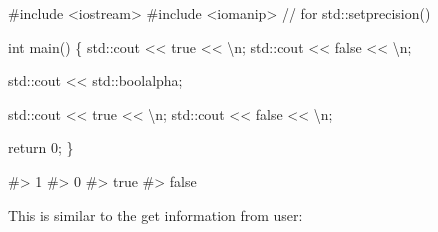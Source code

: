 \documentclass[
  letterpaper,
  DIV=11,
  numbers=noendperiod]{scrreprt}
\newenvironment{Shaded}{\begin{snugshade}}{\end{snugshade}}
\newcommand{\CommentTok}[1]{\textcolor[rgb]{0.37,0.37,0.37}{#1}}
\newcommand{\DecValTok}[1]{\textcolor[rgb]{0.68,0.00,0.00}{#1}}
\newcommand{\ErrorTok}[1]{\textcolor[rgb]{0.68,0.00,0.00}{#1}}
\newcommand{\FunctionTok}[1]{\textcolor[rgb]{0.28,0.35,0.67}{#1}}
\newcommand{\NormalTok}[1]{\textcolor[rgb]{0.00,0.23,0.31}{#1}}
\newcommand{\SpecialCharTok}[1]{\textcolor[rgb]{0.37,0.37,0.37}{#1}}
\newcommand{\StringTok}[1]{\textcolor[rgb]{0.13,0.47,0.30}{#1}}
\begin{document}
\begin{Shaded}
\begin{Highlighting}[]
\CommentTok{\#include \textless{}iostream\textgreater{}}
\CommentTok{\#include \textless{}iomanip\textgreater{}      // for std::setprecision()}

\NormalTok{int }\FunctionTok{main}\NormalTok{()}
\NormalTok{\{}
\NormalTok{    std}\SpecialCharTok{::}\NormalTok{cout }\SpecialCharTok{\textless{}}\ErrorTok{\textless{}}\NormalTok{ true }\SpecialCharTok{\textless{}}\ErrorTok{\textless{}} \StringTok{\textquotesingle{}}\SpecialCharTok{\textbackslash{}n}\StringTok{\textquotesingle{}}\NormalTok{;}
\NormalTok{    std}\SpecialCharTok{::}\NormalTok{cout }\SpecialCharTok{\textless{}}\ErrorTok{\textless{}}\NormalTok{ false }\SpecialCharTok{\textless{}}\ErrorTok{\textless{}} \StringTok{\textquotesingle{}}\SpecialCharTok{\textbackslash{}n}\StringTok{\textquotesingle{}}\NormalTok{;}

\NormalTok{    std}\SpecialCharTok{::}\NormalTok{cout }\SpecialCharTok{\textless{}}\ErrorTok{\textless{}}\NormalTok{ std}\SpecialCharTok{::}\NormalTok{boolalpha;}

\NormalTok{    std}\SpecialCharTok{::}\NormalTok{cout }\SpecialCharTok{\textless{}}\ErrorTok{\textless{}}\NormalTok{ true }\SpecialCharTok{\textless{}}\ErrorTok{\textless{}} \StringTok{\textquotesingle{}}\SpecialCharTok{\textbackslash{}n}\StringTok{\textquotesingle{}}\NormalTok{;}
\NormalTok{    std}\SpecialCharTok{::}\NormalTok{cout }\SpecialCharTok{\textless{}}\ErrorTok{\textless{}}\NormalTok{ false }\SpecialCharTok{\textless{}}\ErrorTok{\textless{}} \StringTok{\textquotesingle{}}\SpecialCharTok{\textbackslash{}n}\StringTok{\textquotesingle{}}\NormalTok{;}

\NormalTok{    return }\DecValTok{0}\NormalTok{;}
\NormalTok{\}}

\CommentTok{\#\textgreater{} 1}
\CommentTok{\#\textgreater{} 0}
\CommentTok{\#\textgreater{} true}
\CommentTok{\#\textgreater{} false}
\end{Highlighting}
\end{Shaded}

This is similar to the get information from user:
\end{document}
